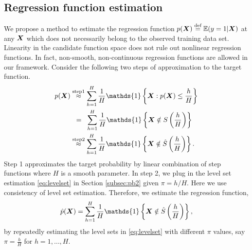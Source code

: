 \documentclass[12pt]{article}
\begin{document}
\subsection{Regression function estimation}
\label{subsec:pb3}
We propose a method to estimate  the regression function $p(\bm X)\stackrel{\text{def}}{=}\mathbb{E}(y = 1|\bm X)$ at any $\bm X$ which does not necessarily belong to the observed training data set. Linearity in the candidate function space does not rule out nonlinear regression functions. In fact, non-smooth, non-continuous regression functions are allowed in our framework. Consider the following two steps of approximation to the target function.
\begin{align}
\label{eq:approx}
p(\mX) &\stackrel{\text{step1}}{\approx} \sum_{h=1}^H\frac{1}{H}\mathds{1}\left\{\mX: p(\mX)\leq\frac{h}{H}\right\}\\&\hspace{.2cm}=\hspace{.2cm} \sum_{h=1}^H\frac{1}{H}\mathds{1}\left\{\mX\notin S\left(\frac{h}{H}\right)\right\}
\\&\stackrel{\text{step2}}{\approx} \sum_{h=1}^H\frac{1}{H}\mathds{1}\left\{\mX\notin\hat S\left(\frac{h}{H}\right)\right\}.
\end{align}
Step 1 approximates the target probability by linear combination of step functions where $H$ is a smooth parameter. In step 2, we plug in the level set estimation \eqref{eq:levelset} in Section \ref{subsec:pb2} given $\pi = h/H$. Here we use consistency of level set estimation.
Therefore, we estimate the regression function,\begin{align}
\hat p(\mX) = \sum_{h=1}^H\frac{1}{H}\mathds{1}\left\{\mX\notin\hat S\left(\frac{h}{H}\right)\right\},
\end{align}
by repeatedly estimating the level sets in \eqref{eq:levelset} with different $\pi$ values, say  $\pi = \frac{h}{H}$ for $h = 1,\ldots, H$. 
\end{document}
